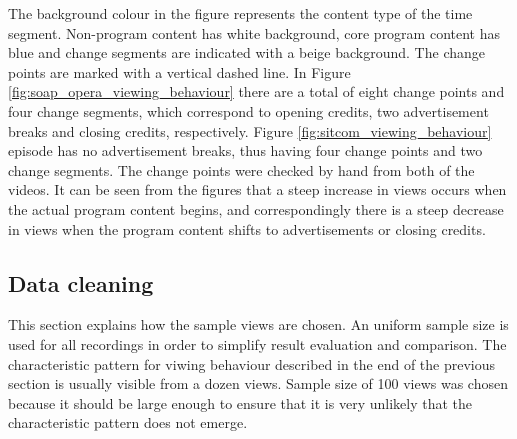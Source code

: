 The background colour in the figure represents the content type of the time segment. Non-program content has white background, core program content has blue and change segments are indicated with a beige background. The change points are marked with a vertical dashed line. In Figure \ref{fig:soap_opera_viewing_behaviour} there are a total of eight change points and four change segments, which correspond to opening credits, two advertisement breaks and closing credits, respectively. Figure \ref{fig:sitcom_viewing_behaviour} episode has no advertisement breaks, thus having four change points and two change segments. The change points were checked by hand from both of the videos. It can be seen from the figures that a steep increase in views occurs when the actual program content begins, and correspondingly there is a steep decrease in views when the program content shifts to advertisements or closing credits.

\subsection{Data cleaning} %


This section explains how the sample views are chosen. An uniform sample size is used for all recordings in order to simplify result evaluation and comparison. The characteristic pattern for viwing behaviour described in the end of the previous section is usually visible from a dozen views. Sample size of 100 views was chosen because it should be large enough to ensure that it is very unlikely that the characteristic pattern does not emerge. %


